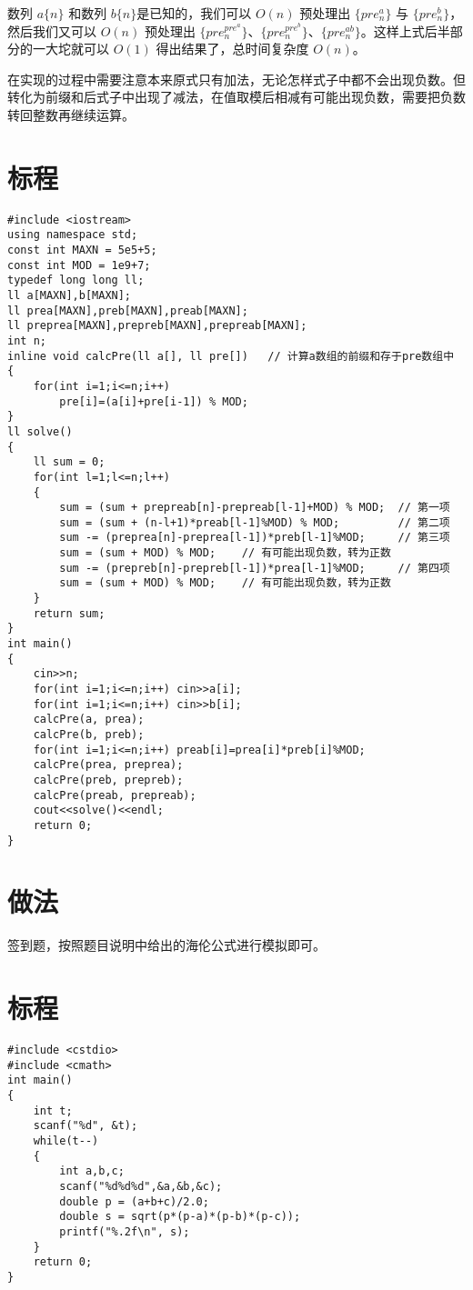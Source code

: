 \documentclass{ctsol}
\begin{document}
数列 $a\{n\}$ 和数列 $b\{n\}$是已知的，我们可以 $O(n)$ 预处理出 $\{pre^a_n\}$ 与 $\{pre^b_n\}$，然后我们又可以 $O(n)$ 预处理出 $\{pre^{pre^a}_n\}$、$\{pre^{pre^b}_n\}$、$\{pre^{ab}_n\}$。这样上式后半部分的一大坨就可以 $O(1)$ 得出结果了，总时间复杂度 $O(n)$。

在实现的过程中需要注意本来原式只有加法，无论怎样式子中都不会出现负数。但转化为前缀和后式子中出现了减法，在值取模后相减有可能出现负数，需要把负数转回整数再继续运算。

\section*{标程}
\begin{lstlisting}
#include <iostream>
using namespace std;
const int MAXN = 5e5+5;
const int MOD = 1e9+7;
typedef long long ll;
ll a[MAXN],b[MAXN];
ll prea[MAXN],preb[MAXN],preab[MAXN];
ll preprea[MAXN],prepreb[MAXN],prepreab[MAXN];
int n;
inline void calcPre(ll a[], ll pre[])   // 计算a数组的前缀和存于pre数组中
{
    for(int i=1;i<=n;i++)
        pre[i]=(a[i]+pre[i-1]) % MOD;
}
ll solve()
{
    ll sum = 0;
    for(int l=1;l<=n;l++)
    {
        sum = (sum + prepreab[n]-prepreab[l-1]+MOD) % MOD;  // 第一项
        sum = (sum + (n-l+1)*preab[l-1]%MOD) % MOD;         // 第二项
        sum -= (preprea[n]-preprea[l-1])*preb[l-1]%MOD;     // 第三项
        sum = (sum + MOD) % MOD;    // 有可能出现负数，转为正数
        sum -= (prepreb[n]-prepreb[l-1])*prea[l-1]%MOD;     // 第四项
        sum = (sum + MOD) % MOD;    // 有可能出现负数，转为正数
    }
    return sum;
}
int main()
{
    cin>>n;
    for(int i=1;i<=n;i++) cin>>a[i];
    for(int i=1;i<=n;i++) cin>>b[i];
    calcPre(a, prea);
    calcPre(b, preb);
    for(int i=1;i<=n;i++) preab[i]=prea[i]*preb[i]%MOD;
    calcPre(prea, preprea);
    calcPre(preb, prepreb);
    calcPre(preab, prepreab);
    cout<<solve()<<endl;
    return 0;
}
\end{lstlisting}

\makesolution
\section*{做法}
签到题，按照题目说明中给出的海伦公式进行模拟即可。

\section*{标程}
\begin{lstlisting}
#include <cstdio>
#include <cmath>
int main()
{
    int t;
    scanf("%d", &t);
    while(t--)
    {
        int a,b,c;
        scanf("%d%d%d",&a,&b,&c);
        double p = (a+b+c)/2.0;
        double s = sqrt(p*(p-a)*(p-b)*(p-c));
        printf("%.2f\n", s);
    }
    return 0;
}
\end{lstlisting}
\end{document}
